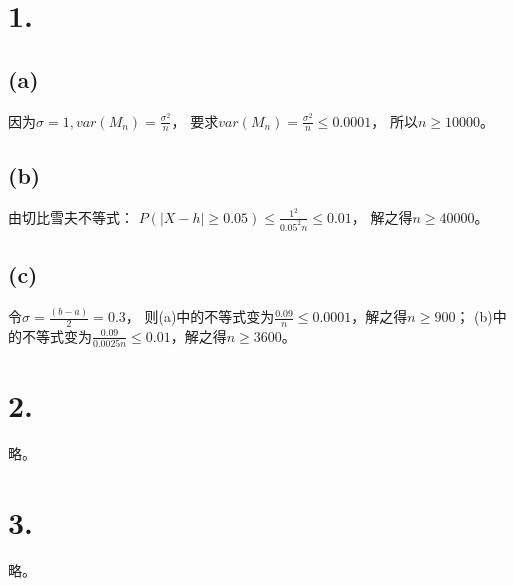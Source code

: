 \documentclass[UTF8]{report}
\begin{document}
    \section*{1.}
        \subsection*{(a)}
            因为$\sigma = 1, var(M_n) = \frac{\sigma^2}{n}$，
            要求$var(M_n) = \frac{\sigma^2}{n} \leq 0.0001$，
            所以$n \geq 10000$。
        \subsection*{(b)}
            由切比雪夫不等式：
            $P(|X - h| \geq 0.05) \leq \frac{1^2}{0.05^2n} \leq 0.01$，
            解之得$n \geq 40000$。
        \subsection*{(c)}
            令$\sigma = \frac{(b - a)}{2} = 0.3$，
            则(a)中的不等式变为$\frac{0.09}{n} \leq 0.0001$，解之得$n \geq 900$；
            (b)中的不等式变为$\frac{0.09}{0.0025n} \leq 0.01$，解之得$n \geq 3600$。
    \section*{2.}
        略。
    \section*{3.}
        略。
\end{document}
